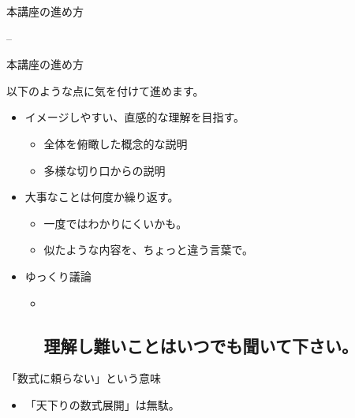 \begin{frame}

\begin{block}{本講座の進め方}

--

\begin{block}{本講座の進め方}

以下のような点に気を付けて進めます。

\begin{itemize}
\tightlist
\item
  イメージしやすい、直感的な理解を目指す。

  \begin{itemize}
  \tightlist
  \item
    全体を俯瞰した概念的な説明
  \item
    多様な切り口からの説明\\
  \end{itemize}
\item
  大事なことは何度か繰り返す。

  \begin{itemize}
  \tightlist
  \item
    一度ではわかりにくいかも。
  \item
    似たような内容を、ちょっと違う言葉で。
  \end{itemize}
\item
  ゆっくり議論

  \begin{itemize}
  \item ~
    \hypertarget{ux7406ux89e3ux3057ux96e3ux3044ux3053ux3068ux306fux3044ux3064ux3067ux3082ux805eux3044ux3066ux4e0bux3055ux3044}{%
    \subsection{\texorpdfstring{{理解し難いことはいつでも聞いて下さい。}}{理解し難いことはいつでも聞いて下さい。}}\label{ux7406ux89e3ux3057ux96e3ux3044ux3053ux3068ux306fux3044ux3064ux3067ux3082ux805eux3044ux3066ux4e0bux3055ux3044}}
  \end{itemize}
\end{itemize}

\end{block}

\begin{block}{「数式に頼らない」という意味}

\begin{itemize}
\tightlist
\item
  「天下りの数式展開」は無駄。


\end{itemize}
\end{block}
\end{block}
\end{frame}
